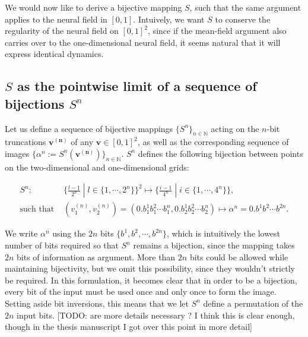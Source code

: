 \documentclass[10pt,letterpaper]{article}
\renewcommand{\vec}[1]{\boldsymbol{#1}}
\begin{document}
We would now like to derive a bijective mapping $S$, such that the same argument applies to the neural field in $[0,1]$. Intuively, we want $S$ to conserve the regularity of the neural field on $[0,1]^2$, since if the mean-field argument also carries over to the one-dimensional neural field, it seems natural that it will express identical dynamics.

\subsection{$S$ as the pointwise limit of a sequence of bijections $S^n$}

Let us define a sequence of bijective mappings $\{S^n\}_{n \in \mathbb N}$ acting on the $n$-bit truncations $\vec{v^{(n)}}$ of any $\vec{v} \in [0,1]^2$, as well as the corresponding sequence of images $\{\alpha^n := S^n(\vec{v^{(n)}})\}_{n \in \mathbb N}$. $S^n$ defines the following bijection between points on the two-dimensional and one-dimensional grids:

\begin{equation} \label{eq:def-S} \begin{aligned}
S^n :& \{\tfrac{l-1}{2^n}\;|\;l\in\{1,\cdots,2^n\}\}^2 \mapsto \{\tfrac{i-1}{4^n}\;|\;i\in\{1,\cdots,4^n\}\},\\
\text{such that }&(v_1^{(n)}, v_2^{(n)}) = (0.b_1^1 b_1^2 \cdots b_1^n, 0.b_2^1 b_2^2 \cdots b_2^n) \mapsto \alpha^n = 0.b^1 b^2 \cdots b^{2n}.
\end{aligned} \end{equation}


We write $\alpha^n$ using the $2n$ bits $\{b^1, b^2, \cdots, b^{2n}\}$, which is intuitively the lowest number of bits required so that $S^n$ remains a bijection, since the mapping takes $2n$ bits of information as argument. More than $2n$ bits could be allowed while maintaining bijectivity, but we omit this possibility, since they wouldn't strictly be required. In this formulation, it becomes clear that in order to be a bijection, every bit of the input must be used once and only once to form the image. Setting aside bit inversions, this means that we let $S^n$ define a permutation of the $2n$ input bits. [TODO: are more details necessary ? I think this is clear enough, though in the thesis manuscript I got over this point in more detail]
\end{document}
